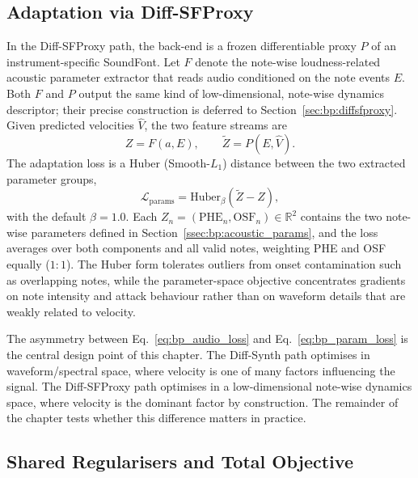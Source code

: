 \subsection{Adaptation via Diff-SFProxy}
\label{ssec:bp:adapt_diffsfproxy}

In the Diff-SFProxy path, the back-end is a frozen differentiable proxy $P$ of an instrument-specific SoundFont. Let $F$ denote the note-wise loudness-related acoustic parameter extractor that reads audio conditioned on the note events $E$. Both $F$ and $P$ output the same kind of low-dimensional, note-wise dynamics descriptor; their precise construction is deferred to Section~\ref{sec:bp:diffsfproxy}. Given predicted velocities $\hat{V}$, the two feature streams are
\begin{equation}
\label{eq:bp_sfproxy_features}
Z = F(a, E), \qquad \tilde{Z} = P(E, \hat{V}).
\end{equation}
The adaptation loss is a Huber (Smooth-$L_1$) distance between the two extracted parameter groups,
\begin{equation}
\label{eq:bp_param_loss}
\mathcal{L}_{\mathrm{params}} = \mathrm{Huber}_\beta\!\left(\tilde{Z} - Z\right),
\end{equation}
with the default $\beta = 1.0$. Each $Z_n = (\mathrm{PHE}_n, \mathrm{OSF}_n) \in \mathbb{R}^2$ contains the two note-wise parameters defined in Section~\ref{ssec:bp:acoustic_params}, and the loss averages over both components and all valid notes, weighting PHE and OSF equally ($1{:}1$). The Huber form tolerates outliers from onset contamination such as overlapping notes, while the parameter-space objective concentrates gradients on note intensity and attack behaviour rather than on waveform details that are weakly related to velocity.

The asymmetry between Eq.~\eqref{eq:bp_audio_loss} and Eq.~\eqref{eq:bp_param_loss} is the central design point of this chapter. The Diff-Synth path optimises in waveform/spectral space, where velocity is one of many factors influencing the signal. The Diff-SFProxy path optimises in a low-dimensional note-wise dynamics space, where velocity is the dominant factor by construction. The remainder of the chapter tests whether this difference matters in practice.

\subsection{Shared Regularisers and Total Objective}
\label{ssec:bp:regularisers}

